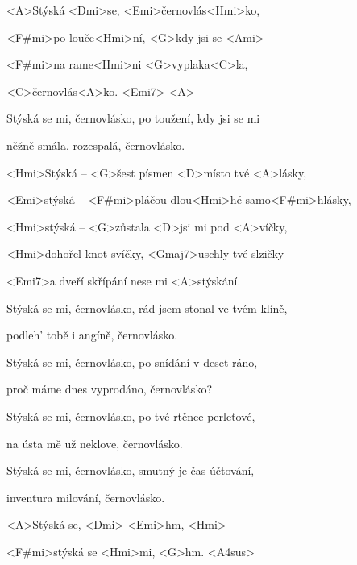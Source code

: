 

\zs
<A>Stýská <Dmi>se, <Emi>černovlás<Hmi>ko,

<F#mi>po louče<Hmi>ní, <G>kdy jsi se <Ami>

<F#mi>na rame<Hmi>ni <G>vyplaka<C>la,

<C>černovlás<A>ko. <Emi7> <A>
\ks

\zs
Stýská se mi, černovlásko, po toužení, kdy jsi se mi

něžně smála, rozespalá, černovlásko.
\ks

\zr
<Hmi>Stýská -- <G>šest písmen <D>místo tvé <A>lásky,

<Emi>stýská -- <F#mi>pláčou dlou<Hmi>hé samo<F#mi>hlásky,

<Hmi>stýská -- <G>zůstala <D>jsi mi pod <A>víčky,

<Hmi>dohořel knot svíčky, <Gmaj7>uschly tvé slzičky

<Emi7>a dveří skřípání nese mi <A>stýskání.
\kr

\zs
Stýská se mi, černovlásko, rád jsem stonal ve tvém klíně,

podleh' tobě i angíně, černovlásko.
\ks

\zs
Stýská se mi, černovlásko, po snídání v deset ráno,

proč máme dnes vyprodáno, černovlásko?
\ks


\zr \kr


\zs
Stýská se mi, černovlásko, po tvé rtěnce perleťové,

na ústa mě už neklove, černovlásko.
\ks

\zs
Stýská se mi, černovlásko, smutný je čas účtování,

inventura milování, černovlásko.
\ks

\zr \kr

\zr
<A>Stýská se, <Dmi> <Emi>hm, <Hmi>

<F#mi>stýská se <Hmi>mi, <G>hm. <A4sus>
\kr

\kp
